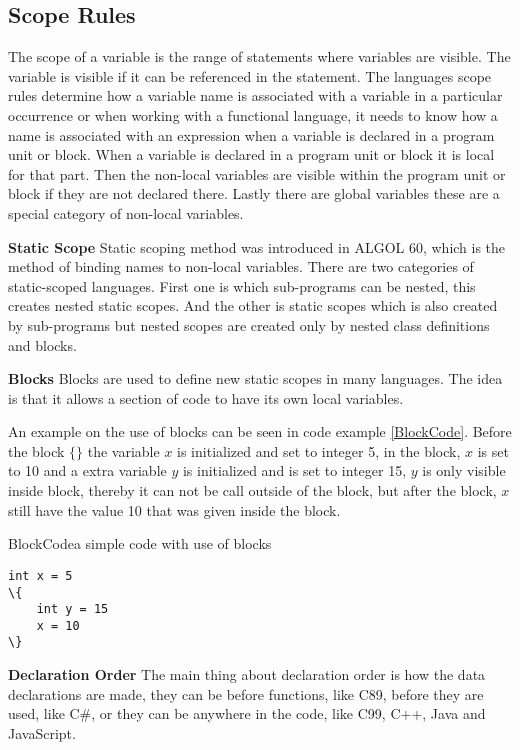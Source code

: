 \subsection{Scope Rules}
The scope of a variable is the range of statements where variables are visible. The variable is visible if it can be referenced in the statement.
The languages scope rules determine how a variable name is associated with a variable in a particular occurrence or when working with a functional language, it needs to know how a name is associated with an expression when a variable is declared in a program unit or block. When a variable is declared in a program unit or block it is local for that part. Then the non-local variables are visible within the program unit or block if they are not declared there. Lastly there are global variables these are a special category of non-local variables.

\textbf{Static Scope}
Static scoping method was introduced in ALGOL 60, which is the method of binding names to non-local variables. There are two categories of static-scoped languages. First one is which sub-programs can be nested, this creates nested static scopes. And the other is static scopes which is also created by sub-programs but nested scopes are created only by nested class definitions and blocks.

\textbf{Blocks}
Blocks are used to define new static scopes in many languages. The idea is that it allows a section of code to have its own local variables.

An example on the use of blocks can be seen in code example \ref{BlockCode}. Before the block $\{ \}$ the variable $x$ is initialized and set to integer 5, in the block, $x$ is set to 10 and a extra variable $y$ is initialized and is set to integer 15, $y$ is only visible inside block, thereby it can not be call outside of the block, but after the block, $x$ still have the value 10 that was given inside the block.

\begin{code}{BlockCode}{a simple code with use of blocks}
\begin{lstlisting}
int x = 5
\{
    int y = 15
    x = 10
\} 
\end{lstlisting}
\end{code}

\textbf{Declaration Order}
The main thing about declaration order is how the data declarations are made, they can be before functions, like C89, before they are used, like C#, or they can be anywhere in the code, like C99, C++, Java and JavaScript.

